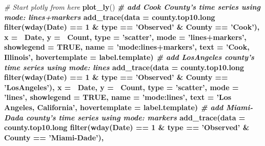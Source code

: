 \documentclass[]{book}
\newenvironment{Shaded}{\begin{snugshade}}{\end{snugshade}}
\newcommand{\KeywordTok}[1]{\textcolor[rgb]{0.13,0.29,0.53}{\textbf{#1}}}
\newcommand{\DataTypeTok}[1]{\textcolor[rgb]{0.13,0.29,0.53}{#1}}
\newcommand{\DecValTok}[1]{\textcolor[rgb]{0.00,0.00,0.81}{#1}}
\newcommand{\StringTok}[1]{\textcolor[rgb]{0.31,0.60,0.02}{#1}}
\newcommand{\CommentTok}[1]{\textcolor[rgb]{0.56,0.35,0.01}{\textit{#1}}}
\newcommand{\OtherTok}[1]{\textcolor[rgb]{0.56,0.35,0.01}{#1}}
\newcommand{\OperatorTok}[1]{\textcolor[rgb]{0.81,0.36,0.00}{\textbf{#1}}}
\newcommand{\NormalTok}[1]{#1}
\begin{document}
\begin{Shaded}
\begin{Highlighting}[]
\CommentTok{# Start plotly from here}
\KeywordTok{plot_ly}\NormalTok{() }\OperatorTok{%
\StringTok{  }\CommentTok{# add Cook County’s time series using mode: lines+markers}
\StringTok{  }\KeywordTok{add_trace}\NormalTok{(}\DataTypeTok{data =}\NormalTok{ county.top10.long }\OperatorTok{%
\StringTok{    }\KeywordTok{filter}\NormalTok{(}\KeywordTok{wday}\NormalTok{(Date) }\OperatorTok{==}\StringTok{ }\DecValTok{1} \OperatorTok{&}\StringTok{ }\NormalTok{type }\OperatorTok{==}\StringTok{ 'Observed'} \OperatorTok{&}\StringTok{ }\NormalTok{County }\OperatorTok{==}\StringTok{ 'Cook'}\NormalTok{), }
    \DataTypeTok{x =} \OperatorTok{~}\NormalTok{Date, }\DataTypeTok{y =} \OperatorTok{~}\NormalTok{Count, }\DataTypeTok{type =} \StringTok{'scatter'}\NormalTok{, }\DataTypeTok{mode =} \StringTok{'lines+markers'}\NormalTok{,}
    \DataTypeTok{showlegend =} \OtherTok{TRUE}\NormalTok{, }\DataTypeTok{name =} \StringTok{'mode:lines+markers'}\NormalTok{, }
    \DataTypeTok{text =} \StringTok{'Cook, Illinois'}\NormalTok{, }\DataTypeTok{hovertemplate =}\NormalTok{ label.template) }\OperatorTok{%
\StringTok{  }\CommentTok{# add LosAngeles county’s time series using mode: lines}
\StringTok{  }\KeywordTok{add_trace}\NormalTok{(}\DataTypeTok{data =}\NormalTok{ county.top10.long }\OperatorTok{%
\StringTok{    }\KeywordTok{filter}\NormalTok{(}\KeywordTok{wday}\NormalTok{(Date) }\OperatorTok{==}\StringTok{ }\DecValTok{1} \OperatorTok{&}\StringTok{ }\NormalTok{type }\OperatorTok{==}\StringTok{ 'Observed'} \OperatorTok{&}\StringTok{ }\NormalTok{County }\OperatorTok{==}\StringTok{ 'LosAngeles'}\NormalTok{), }
    \DataTypeTok{x =} \OperatorTok{~}\NormalTok{Date, }\DataTypeTok{y =} \OperatorTok{~}\NormalTok{Count, }\DataTypeTok{type =} \StringTok{'scatter'}\NormalTok{, }\DataTypeTok{mode =} \StringTok{'lines'}\NormalTok{,}
    \DataTypeTok{showlegend =} \OtherTok{TRUE}\NormalTok{, }\DataTypeTok{name =} \StringTok{'mode:lines'}\NormalTok{, }
    \DataTypeTok{text =} \StringTok{'Los Angeles, California'}\NormalTok{, }\DataTypeTok{hovertemplate =}\NormalTok{ label.template) }\OperatorTok{%
\StringTok{  }\CommentTok{# add Miami-Dada county’s time series using mode: markers}
\StringTok{  }\KeywordTok{add_trace}\NormalTok{(}\DataTypeTok{data =}\NormalTok{ county.top10.long }\OperatorTok{%
\StringTok{    }\KeywordTok{filter}\NormalTok{(}\KeywordTok{wday}\NormalTok{(Date) }\OperatorTok{==}\StringTok{ }\DecValTok{1} \OperatorTok{&}\StringTok{ }\NormalTok{type }\OperatorTok{==}\StringTok{ 'Observed'} \OperatorTok{&}\StringTok{ }\NormalTok{County }\OperatorTok{==}\StringTok{ 'Miami-Dade'}\NormalTok{), }
}}}}}}
\end{Highlighting}
\end{Shaded}
\end{document}
